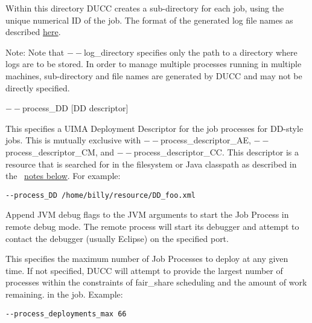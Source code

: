 \begin{description}
             Within this directory DUCC creates a sub-directory for each job, using the unique numerical 
             ID of the job. The format of the generated log file names as described
             \hyperref[chap:job-logs]{here}.
             
             Note: Note that $--$log\_directory specifies only the path to a directory where 
             logs are to be stored. In order to manage multiple processes running in multiple 
             machines, sub-directory and file names are generated by DUCC and may 
             not be directly specified. 

           \begin{sloppypar}
           \item[$--$process\_DD {[DD descriptor]}  ]

             This specifies a UIMA Deployment Descriptor for the job processes for DD-style jobs. 
             This is mutually exclusive with $--$process\_descriptor\_AE, $--$process\_descriptor\_CM, 
             and $--$process\_descriptor\_CC. This 
             descriptor is a resource that is searched for in the filesystem or Java classpath as described 
             in the ~\hyperref[par:cli.submit.notes]{notes below}.
             For example:
             \begin{verbatim}
--process_DD /home/billy/resource/DD_foo.xml 
             \end{verbatim}
           \end{sloppypar}

           \item[$--$process\_debug {[debug-port]}] Append JVM debug flags to the JVM
             arguments to start the Job Process in remote debug mode.  The remote process will start
             its debugger and attempt to contact the debugger (usually Eclipse) on the specified
             port.
             
           \item[$--$process\_deployments\_max {[integer]} ]

             This specifies the maximum number of Job Processes to deploy at any given time. If not 
             specified, DUCC will attempt to provide the largest number of processes within the 
             constraints of fair\_share scheduling and the amount of work remaining.
             in the job. Example:
             \begin{verbatim}
--process_deployments_max 66 
             \end{verbatim}



\end{description}
